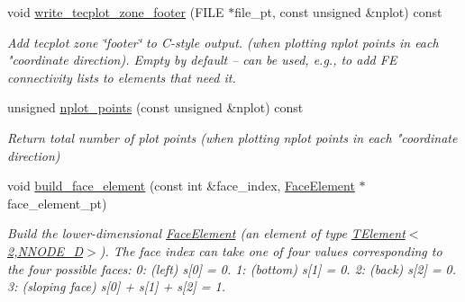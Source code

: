 \begin{DoxyCompactItemize}
void \hyperlink{classoomph_1_1TElement_3_013_00_01NNODE__1D_01_4_a973cf0f35d33832837a620f3d7ac464f}{write\+\_\+tecplot\+\_\+zone\+\_\+footer} (F\+I\+LE $\ast$file\+\_\+pt, const unsigned \&nplot) const
\begin{DoxyCompactList}\small\item\em Add tecplot zone \char`\"{}footer\char`\"{} to C-\/style output. (when plotting nplot points in each "coordinate direction). Empty by default -- can be used, e.\+g., to add FE connectivity lists to elements that need it. \end{DoxyCompactList}\item 
unsigned \hyperlink{classoomph_1_1TElement_3_013_00_01NNODE__1D_01_4_aa9431fb359bcf4ac23ce94f0142b8353}{nplot\+\_\+points} (const unsigned \&nplot) const
\begin{DoxyCompactList}\small\item\em Return total number of plot points (when plotting nplot points in each "coordinate direction) \end{DoxyCompactList}\item 
void \hyperlink{classoomph_1_1TElement_3_013_00_01NNODE__1D_01_4_ad28be1d4ceed10d143dccbeb0021d507}{build\+\_\+face\+\_\+element} (const int \&face\+\_\+index, \hyperlink{classoomph_1_1FaceElement}{Face\+Element} $\ast$face\+\_\+element\+\_\+pt)
\begin{DoxyCompactList}\small\item\em Build the lower-\/dimensional \hyperlink{classoomph_1_1FaceElement}{Face\+Element} (an element of type \hyperlink{classoomph_1_1TElement_3_012_00_01NNODE__1D_01_4}{T\+Element$<$2,\+N\+N\+O\+D\+E\+\_\+D$>$}). The face index can take one of four values corresponding to the four possible faces\+: 0\+: (left) s\mbox{[}0\mbox{]} = 0. 1\+: (bottom) s\mbox{[}1\mbox{]} = 0. 2\+: (back) s\mbox{[}2\mbox{]} = 0. 3\+: (sloping face) s\mbox{[}0\mbox{]} + s\mbox{[}1\mbox{]} + s\mbox{[}2\mbox{]} = 1. \end{DoxyCompactList}\end{DoxyCompactItemize}
